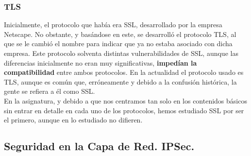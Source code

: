 \subsubsection{\acrfull{TLS}}

Inicialmente, el protocolo que había era \acrshort{SSL}, desarrollado por la empresa Netscape. No obstante, y basándose en este, se desarrolló el protocolo \acrshort{TLS}, al que se le cambió el nombre para indicar que ya no estaba asociado con dicha empresa. Este protocolo solventa distintas vulnerabilidades de \acrshort{SSL}, aunque las diferencias inicialmente no eran muy significativas, \textbf{impedían la compatibilidad} entre ambos protocolos. En la actualidad el protocolo usado es \acrshort{TLS}, aunque es común que, erróneamente y debido a la confusión histórica, la gente se refiera a él como \acrshort{SSL}.\\

En la asignatura, y debido a que nos centramos tan solo en los contenidos básicos sin entrar en detalle en cada uno de los protocolos, hemos estudiado \acrshort{SSL} por ser el primero, aunque en lo estudiado no difieren.

\subsection{Seguridad en la Capa de Red. \acrshort{IPSec}.}

